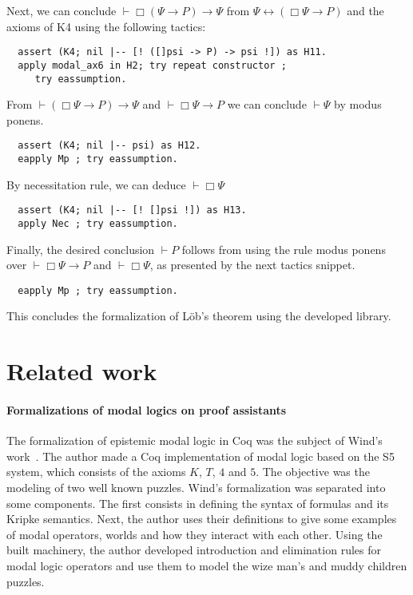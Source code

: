 \documentclass[sigconf]{acmart}
\begin{document}
\noindent Next, we can conclude $\vdash \Box (\Psi \to P) \to \Psi$ from
$\Psi \leftrightarrow (\Box \Psi \to P)$ and the axioms of K4 using
the following tactics:

\begin{verbatim}
  assert (K4; nil |-- [! ([]psi -> P) -> psi !]) as H11.
  apply modal_ax6 in H2; try repeat constructor ;
     try eassumption.
\end{verbatim}

\noindent From $\vdash (\Box\Psi \to P) \to \Psi$ and $\vdash \Box \Psi \to P$
we can conclude $\vdash \Psi$ by modus ponens.

\begin{verbatim}
  assert (K4; nil |-- psi) as H12.
  eapply Mp ; try eassumption.
\end{verbatim}

\noindent By necessitation rule, we can deduce $\vdash \Box \Psi$

\begin{verbatim}
  assert (K4; nil |-- [! []psi !]) as H13.
  apply Nec ; try eassumption.
\end{verbatim}

\noindent Finally, the desired conclusion $\vdash P$ follows from
using the rule modus ponens over $\vdash \Box \Psi \to P$
and $\vdash \Box \Psi$, as presented by the next tactics
snippet.

\begin{verbatim}
  eapply Mp ; try eassumption.
\end{verbatim}

\noindent This concludes the formalization of L\"ob's theorem using
the developed library.

\section{Related work}\label{sec:related}

\paragraph{Formalizations of modal logics on proof assistants}

The formalization of epistemic modal logic in Coq was the subject of Wind's
work~\cite{dewind}.
The author made a Coq implementation of modal logic based on the S5 system,
which consists of  the axioms $K$, $T$, $4$ and $5$. The objective was the
modeling of two well known puzzles.
Wind's formalization was separated into some components. The first consists in
defining the syntax of formulas and its Kripke semantics. Next, the author uses
their definitions to give some examples of modal operators, worlds and how they
interact with each other. Using the built machinery, the author developed
introduction and elimination rules for modal logic operators and use them to
model the wize man's and muddy children puzzles.
\end{document}
